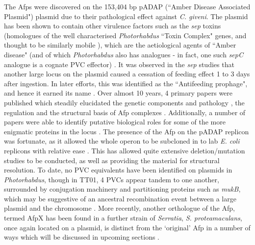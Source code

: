 The Afps were discovered on the 153,404 bp pADAP (``Amber Disease Associated Plasmid") plasmid \citep{Hurst2011a} due to their pathological effect against \emph{C. giveni}. The plasmid has been shown to contain other virulence factors such as the \emph{sep} toxins (homologues of the well characterised \emph{Photorhabdus} ``Toxin Complex" genes, and thought to be similarly mobile \citep{Dodd2006a}), which are the aetiological agents of ``Amber disease" (and of which \emph{Photorhabdus} also has analogues - in fact, one such \emph{sepC} analogue is a cognate PVC effector) \citep{Hurst2000}. It was observed in the \emph{sep} studies that another large locus on the plasmid caused a cessation of feeding effect 1 to 3 days after ingestion. In later efforts, this was identified as the ``Antifeeding prophage", and hence it earned its name \citep{Hurst2004}. Over almost 10 years, 4 primary papers were published which steadily elucidated the genetic components and pathology \citep{Hurst2004}, the regulation \citep{Hurst2007a} and the structural basis of Afp complexes \citep{Sen2010, Heymann2013}. Additionally, a number of papers were able to identify putative biological roles for some of the more enigmatic proteins in the locus \cite{Rybakova2013, Rybakova2015}. The presence of the Afp on the pADAP replicon was fortunate, as it allowed the whole operon to be subcloned in to lab \emph{E. coli} replicons with relative ease \citep{Hurst2004}. This has allowed quite extensive deletion/mutation studies to be conducted, as well as providing the material for structural resolution. To date, no PVC equivalents have been identified on plasmids in \emph{Photorhabdus}, though in \Plum{} TT01, 4 PVCs appear tandem to one another, surrounded by conjugation machinery and partitioning proteins such as \emph{mukB}, which may be suggestive of an ancestral recombination event between a large plasmid and the chromosome \citep{Yang2006}. More recently, another orthologue of the Afp, termed AfpX has been found in a further strain of \emph{Serratia}, \emph{S. proteamaculans}, once again located on a plasmid, is distinct from the `original' Afp in a number of ways which will be discussed in upcoming sections \citep{Hurst2018}.

